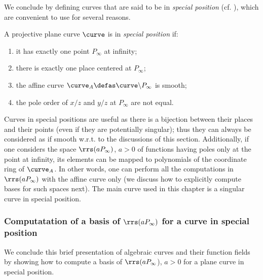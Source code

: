 We conclude by defining curves that are said to be in \emph{special position} (cf. \eg \cite{DBLP:journals/tit/SaintsH95}), which are convenient to use for several reasons.

\begin{defi}
A projective plane curve $\curve$ is in \emph{special position} if:
\begin{enumerate}
\item it has exactly one point $P_\infty$ at infinity;
\item there is exactly one place centered at $P_\infty$;
\item the affine curve $\curve_A \defas \curve\backslash P_\infty$ is smooth;
\item the pole order of $x/z$ and $y/z$ at $P_\infty$ are not equal.
\end{enumerate}
\end{defi}

Curves in special positions are useful as there is a bijection between their places and their points (even if they are potentially singular); thus they can always be considered
as if smooth w.r.t. to the discussions of this section. Additionally, if one considers the space $\rrs(aP_\infty)$, $a > 0$ of functions having poles only at the point at infinity,
its elements can be mapped to polynomials of the coordinate ring of $\curve_A$. In other words, one can perform all the computations in $\rrs(aP_\infty)$ with the affine curve
only (we discuss how to explicitly compute bases for such spaces next). The main curve used in this chapter is a singular curve in special position.

\subsubsection{Computatation of a basis of $\rrs(aP_\infty)$ for a curve in special position}

We conclude this brief presentation of algebraic curves and their function fields by showing how to compute a basis of $\rrs(aP_\infty$), $a > 0$
for a plane curve in special position.

